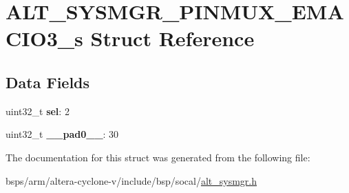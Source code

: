 \hypertarget{structALT__SYSMGR__PINMUX__EMACIO3__s}{}\section{A\+L\+T\+\_\+\+S\+Y\+S\+M\+G\+R\+\_\+\+P\+I\+N\+M\+U\+X\+\_\+\+E\+M\+A\+C\+I\+O3\+\_\+s Struct Reference}
\label{structALT__SYSMGR__PINMUX__EMACIO3__s}
\subsection*{Data Fields}
\begin{DoxyCompactItemize}
\item 
\mbox{\label{structALT__SYSMGR__PINMUX__EMACIO3__s_a4cf5f72359f1d2c9d66216b06621a429}} 
uint32\+\_\+t {\bfseries sel}\+: 2
\item 
\mbox{\label{structALT__SYSMGR__PINMUX__EMACIO3__s_a37ad468006432d5f0ea7a24f4c7fc4eb}} 
uint32\+\_\+t {\bfseries \+\_\+\+\_\+pad0\+\_\+\+\_\+}\+: 30
\end{DoxyCompactItemize}


The documentation for this struct was generated from the following file\+:\begin{DoxyCompactItemize}
\item 
bsps/arm/altera-\/cyclone-\/v/include/bsp/socal/\mbox{\hyperlink{alt__sysmgr_8h}{alt\+\_\+sysmgr.\+h}}\end{DoxyCompactItemize}
